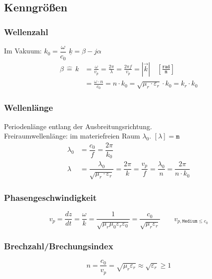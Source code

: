 \subsection{Kenngrößen}
\subsubsection{Wellenzahl}
Im Vakuum: $k_{0}=\dfrac{\omega}{c_{0}}$ \quad $ \underline{k}=\beta - \si{j}\alpha $
\begin{align*}
	\beta \, \widehat{=} \, k & = \frac{\omega}{v_p} = \frac{2\pi}{\lambda} = \frac{2 \pi f}{v_p} = |\vec{k}| \quad \left[ \frac{\texttt{rad}}{\texttt{m}}\right] \\
	                          & = \frac{\omega \cdot n}{c_{0}} = n \cdot k_{0}=\sqrt{\mu_{r} \cdot \varepsilon_{r}} \cdot k_{0} = k_{r} \cdot k_{0}
\end{align*}

\subsubsection{Wellenlänge}
Periodenlänge entlang der Ausbreitungsrichtung.\\
Freiraumwellenlänge: im materiefreien Raum $ \lambda_0 $. \qquad $[\lambda] = \texttt{m}$
\begin{align*}
	\lambda_0 & = \dfrac{c_0}{f} = \dfrac{2\pi}{k_0}                                                                                                          \\
	\lambda   & = \dfrac{\lambda_0}{\sqrt{\mu_r \cdot \varepsilon_r}} = \dfrac{2 \pi}{k} = \dfrac{v_p}{f} = \dfrac{\lambda_0}{n} = \dfrac{2 \pi}{n \cdot k_0}
\end{align*}

\subsubsection{Phasengeschwindigkeit}
\[
	v_p = \dfrac{d z}{d t} = \dfrac{\omega}{k} = \frac{1}{\sqrt{ \mu_r \mu_0 \varepsilon_r \varepsilon_0} } = \frac{c_0}{\sqrt{\mu_r \varepsilon_r}} \qquad v_{p,\texttt{Medium} \leq c_0}
\]

\subsubsection{Brechzahl/Brechungsindex}
\[
	n = \frac{c_0}{v_p} = \sqrt{\mu_r \varepsilon_r} \approx \sqrt{\varepsilon_r} \geq 1
\]
